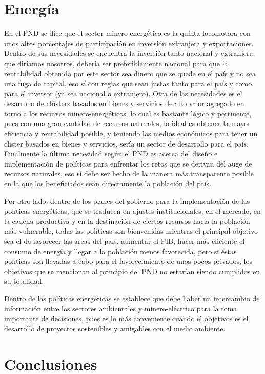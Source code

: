 \documentclass[journal]{./oldtran/IEEEtran}
\begin{document}
\section{Energía}
En el PND se dice que el sector minero-energético es la quinta locomotora con unos altos porcentajes de participación en inversión extranjera y exportaciones.
Dentro de sus necesidades se encuentra la inversión tanto nacional y extranjera, que diríamos nosotros, debería  ser  preferiblemente nacional para que la rentabilidad obtenida por este sector sea dinero que se quede en el país y no sea una fuga de capital, eso sí con reglas que sean justas tanto para el país y como para el inversor (ya sea nacional o extranjero).
Otra de las necesidades es el desarrollo de clústers basados en bienes y servicios de alto valor agregado en torno a los recursos minero-energéticos, lo cual es bastante lógico y pertinente,  pues con una gran cantidad de recursos naturales, lo ideal es obtener la mayor eficiencia y rentabilidad  posible, y teniendo los medios económicos para tener un clister basados en  bienes y servicios, sería un sector de desarrollo para  el país. 
Finalmente la última necesidad según el PND es acerca del diseño e implementación de políticas para enfrentar los retos que se derivan del auge de recursos naturales, eso sí debe ser hecho de la manera más transparente posible en la que los beneficiados sean directamente la población del país.

Por otro lado,  dentro de los planes del gobierno para la implementación de las políticas energéticas,  que se traducen en ajustes institucionales,  en el mercado, en  la cadena productiva y en la destinación de ciertos recursos hacia la población más vulnerable, todas las políticas son bienvenidas mientras el principal objetivo sea el de  favorecer las arcas del país, aumentar el PIB, hacer más eficiente el consumo de energía y llegar a la población menos favorecida,  pero si éstas políticas son llevadas a cabo para el favorecimiento de unos pocos privados, los objetivos que se mencionan al principio del PND  no estarían siendo cumplidos en su totalidad.

Dentro de las políticas energéticas se establece que debe haber un intercambio de información entre los sectores ambientales y minero-eléctrico para la toma importante de decisiones, pues es lo más conveniente cuando el objetivos es el desarrollo de proyectos sostenibles y amigables con el medio ambiente.



\section{Conclusiones}
\end{document}

